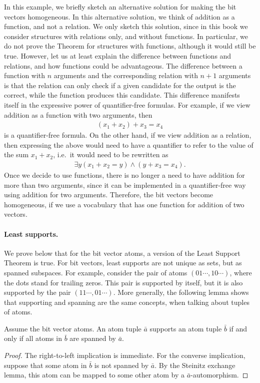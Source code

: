 \begin{myexample}
	In this example, we briefly sketch an alternative  solution for making the bit vectors homogeneous. In this alternative solution, we think  of addition as a function, and not a relation. We only sketch this solution, since in this book we   consider structures with relations only, and without  functions. In particular, we do not prove the \fraisse Theorem for structures with functions, although it would still be true. However, let us at least explain the difference between functions and relations, and how functions could be advantageous.  The difference between a function with $n$ arguments and the corresponding relation with $n+1$ arguments is that the relation can only check if a given candidate for the output is the correct, while the function produces this candidate. This difference manifests itself in the expressive power of  quantifier-free formulas. For example, if we view addition as a function with two arguments, then 
\begin{align*}
(x_1 + x_2) + x_3 = x_4
\end{align*}
is a quantifier-free formula. On the other hand, if we view addition as a relation, then expressing the above  would need to have a quantifier to refer to the value of the sum $x_1+x_2$, i.e.~it would need to be rewritten as 
\begin{align*}
\exists y  (x_1 + x_2 = y) \land (y + x_3 = x_4).
\end{align*}
Once we decide to use functions, there is no longer a need to have addition for more than two arguments, since it can be implemented in a quantifier-free way using addition for two arguments. Therefore, the bit vectors become homogeneous, if we use a vocabulary that has one function for addition of two vectors. 
\end{myexample}



\paragraph*{Least supports.} We prove below that for the bit vector atoms, a version of the Least Support Theorem is true.  For bit vectors, least supports are not unique as sets, but as spanned subspaces. For example, consider the pair of atoms $(01 \cdots,10 \cdots)$, where the dots stand for trailing zeros. This pair is supported by itself, but it is also supported by the pair $(11 \cdots ,01 \cdots)$. More generally, the following lemma shows that supporting and spanning are the same concepts, when talking about tuples of atoms. 
\begin{lemma} Assume the bit vector atoms. 
 An atom tuple $\bar a$ supports an atom tuple $\bar b$ if and only if all atoms in $\bar b$ are spanned by $\bar a$. 
\end{lemma}
\begin{proof}
 The right-to-left implication is immediate. For the converse implication, suppose that some atom in $\bar b$ is not spanned by $\bar a$. By the Steinitz exchange lemma, this atom can be mapped to some other atom by a $\bar a$-automorphism.
\end{proof}

